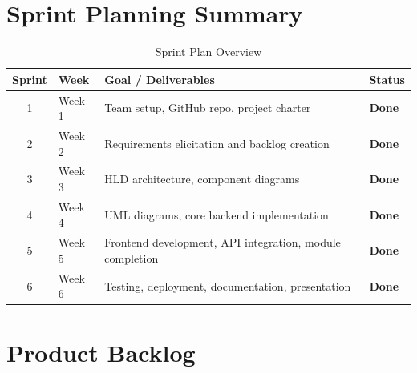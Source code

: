 \documentclass[12pt,a4paper]{report}
\newcommand{\rowE}{\rowcolor{White}}
\newcommand{\rowO}{\rowcolor{LightGray!60}}
\begin{document}
\section{Sprint Planning Summary}

\begin{table}[H]
\centering
\caption{Sprint Plan Overview}
\begin{tabularx}{\textwidth}{c l X l}
\toprule
\rowcolor{PrimaryBlue!15}
\textbf{Sprint} & \textbf{Week} & \textbf{Goal / Deliverables} & \textbf{Status} \\
\midrule
\rowO 1 & Week 1 & Team setup, GitHub repo, project charter & \textcolor{AccentGreen}{\textbf{Done}} \\
\rowE 2 & Week 2 & Requirements elicitation and backlog creation & \textcolor{AccentGreen}{\textbf{Done}} \\
\rowO 3 & Week 3 & HLD architecture, component diagrams & \textcolor{AccentGreen}{\textbf{Done}} \\
\rowE 4 & Week 4 & UML diagrams, core backend implementation & \textcolor{AccentGreen}{\textbf{Done}} \\
\rowO 5 & Week 5 & Frontend development, API integration, module completion & \textcolor{AccentGreen}{\textbf{Done}} \\
\rowE 6 & Week 6 & Testing, deployment, documentation, presentation & \textcolor{AccentGreen}{\textbf{Done}} \\
\bottomrule
\end{tabularx}
\end{table}

\section{Product Backlog}
\end{document}
